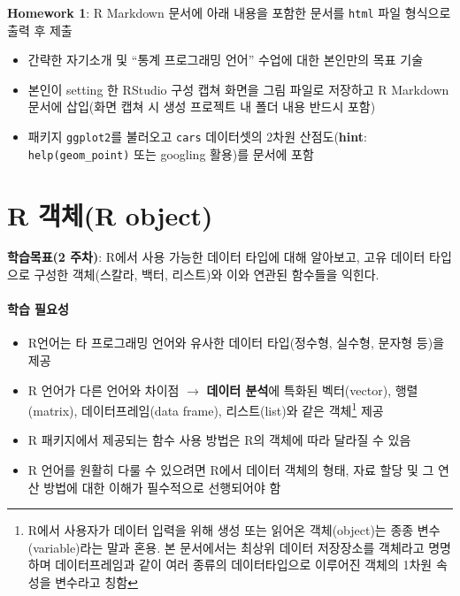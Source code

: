 \documentclass[
  11pt,
]{krantz}
\providecommand{\tightlist}{%
  \setlength{\itemsep}{0pt}\setlength{\parskip}{0pt}}
\let\BeginKnitrBlock\begin \let\EndKnitrBlock\end
\begin{document}
\normalsize

\footnotesize

\BeginKnitrBlock{rmdimportant}
\textbf{Homework 1}: R Markdown 문서에 아래 내용을 포함한 문서를 \texttt{html} 파일 형식으로 출력 후 제출

\begin{itemize}
\tightlist
\item
  간략한 자기소개 및 ``통계 프로그래밍 언어'' 수업에 대한 본인만의 목표 기술
\item
  본인이 setting 한 RStudio 구성 캡쳐 화면을 그림 파일로 저장하고 R Markdown 문서에 삽입(화면 캡쳐 시 생성 프로젝트 내 폴더 내용 반드시 포함)
\item
  패키지 \texttt{ggplot2}를 불러오고 \texttt{cars} 데이터셋의 2차원 산점도(\textbf{hint}: \texttt{help(geom\_point)} 또는 googling 활용)를 문서에 포함
\end{itemize}
\EndKnitrBlock{rmdimportant}

\normalsize

\hypertarget{data-type}{%
\chapter{R 객체(R object)}\label{data-type}}

\footnotesize

\BeginKnitrBlock{rmdnote}
\textbf{학습목표(2 주차)}: R에서 사용 가능한 데이터 타입에 대해 알아보고, 고유 데이터 타입으로 구성한 객체(스칼라, 백터, 리스트)와 이와 연관된 함수들을 익힌다.
\EndKnitrBlock{rmdnote}

\normalsize

\hypertarget{ch2-abstract}{%
\subsubsection*{학습 필요성}\label{ch2-abstract}}


\begin{itemize}
\tightlist
\item
  R언어는 타 프로그래밍 언어와 유사한 데이터 타입(정수형, 실수형, 문자형 등)을 제공
\item
  R 언어가 다른 언어와 차이점 \(\rightarrow\) \textbf{데이터 분석}에 특화된 벡터(vector), 행렬(matrix), 데이터프레임(data frame), 리스트(list)와 같은 객체\footnote{R에서 사용자가 데이터 입력을 위해 생성 또는 읽어온 객체(object)는 종종 변수(variable)라는 말과 혼용. 본 문서에서는 최상위 데이터 저장장소를 객체라고 명명하며 데이터프레임과 같이 여러 종류의 데이터타입으로 이루어진 객체의 1차원 속성을 변수라고 칭함} 제공
\item
  R 패키지에서 제공되는 함수 사용 방법은 R의 객체에 따라 달라질 수 있음\\
\item
  R 언어를 원활히 다룰 수 있으려면 R에서 데이터 객체의 형태, 자료 할당 및 그 연산 방법에 대한 이해가 필수적으로 선행되어야 함
\end{itemize}
\end{document}
